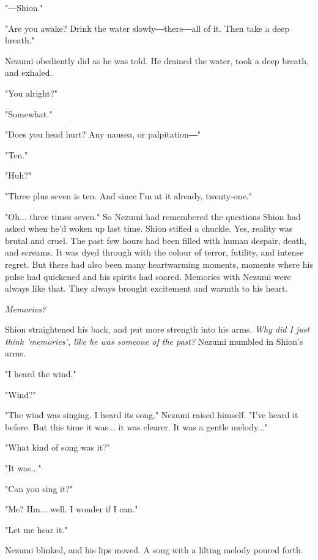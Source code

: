 "―Shion."

"Are you awake? Drink the water slowly―there―all of it. Then take a deep
breath."

Nezumi obediently did as he was told. He drained the water, took a deep
breath, and exhaled.

"You alright?"

"Somewhat."

"Does you head hurt? Any nausea, or palpitation―"

"Ten."

"Huh?"

"Three plus seven is ten. And since I'm at it already, twenty-one."

"Oh... three times seven." So Nezumi had remembered the questions Shion
had asked when he'd woken up last time. Shion stifled a chuckle. Yes,
reality was brutal and cruel. The past few hours had been filled with
human despair, death, and screams. It was dyed through with the colour
of terror, futility, and intense regret. But there had also been many
heartwarming moments, moments where his pulse had quickened and his
spirits had soared. Memories with Nezumi were always like that. They
always brought excitement and warmth to his heart.

\emph{Memories?}

Shion straightened his back, and put more strength into his arms. \emph{Why
	did I just think 'memories', like he was someone of the past?} Nezumi
mumbled in Shion's arms.

"I heard the wind."

"Wind?"

"The wind was singing. I heard its song." Nezumi raised himself. "I've
heard it before. But this time it was... it was clearer. It was a gentle
melody..."

"What kind of song was it?"

"It was..."

"Can you sing it?"

"Me? Hm... well. I wonder if I can."

"Let me hear it."

Nezumi blinked, and his lips moved. A song with a lilting melody poured
forth.


